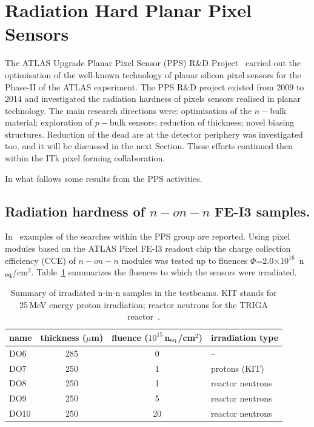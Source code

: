 \section{Radiation Hard Planar Pixel Sensors}
\label{sec:radhardpixels}

The ATLAS Upgrade Planar Pixel Sensor (PPS) R\&D Project~\cite{PPS:proj} carried out the optimisation of the 
well-known technology of planar silicon pixel sensors for the Phase-II of the ATLAS experiment. 
The PPS R\&D project existed from 2009 to 2014 and investigated the radiation hardness of 
pixels sensors realised in planar technology. The main research directions were: optimisation 
of the $n-$bulk material; exploration of $p-$bulk sensors; reduction of thickness; novel biasing 
structures.  
Reduction of the dead are at the detector periphery was investigated too, and it will be discussed in the 
next Section. 
These efforts   continued then within the ITk pixel forming collaboration. 

In what follows some results from the PPS activities.

\subsection{Radiation hardness of $n-on-n$ FE-I3 samples.}
In~\cite{BOMBEN2012940,1748-0221-7-10-P10028} examples of the searches within the PPS group 
are reported. Using pixel modules based on the ATLAS Pixel FE-I3 readout chip the charge collection 
efficiency (CCE) of $n-on-n$ modules was tested up to fluences 
$\Phi$=2.0$\times10^{16}$~n$_{\rm eq}$/cm$^2$. Table~\ref{tab:n-in-n} summarizes the fluences to which 
the sensors were irradiated.

\begin{table}[!htb]
\caption{\label{tab:n-in-n}Summary of irradiated n-in-n samples in the testbeams. KIT stands for 25\,MeV energy proton irradiation; reactor neutrons for the TRIGA reactor~\cite{SNOJ2011136}.
}
\begin{center}
\begin{tabular}{l|c|c|l}
name & thickness ($\mu$m)  & fluence ($10^{15}$\,n$_{\rm eq}$/cm$^2$) & irradiation type\\
\hline \hline
DO6 & 285 & 0 & -- \\
DO7 & 250 & 1 & protons (KIT)  \\
DO8 & 250 & 1 & reactor neutrons  \\
DO9 & 250 & 5 & reactor neutrons \\
DO10 & 250 & 20 & reactor neutrons \\
\hline
\end{tabular}
\end{center}
\end{table} 

